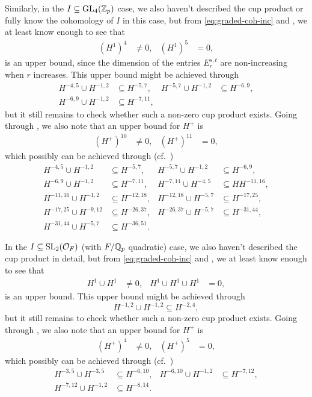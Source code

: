 Similarly, in the $I \subseteq \operatorname{GL}_{4}(\mathbb{Z}_{p})$ case, we also haven't described the cup product or fully know the cohomology of $I$ in this case, but from \eqref{eq:graded-coh-inc} and , we at least know enough to see that
\begin{align*}
  (H^{1})^{4} &\neq 0, & (H^{1})^{5} &= 0,
\end{align*}
is an upper bound, since the dimension of the entries $E_{r}^{s,t}$ are non-increasing when $r$ increases. This upper bound might be achieved through
\begin{align*}
  H^{-4,5} \cup H^{-1,2} &\subseteq H^{-5,7}, & H^{-5,7} \cup H^{-1,2} &\subseteq H^{-6,9}, \\
  H^{-6,9} \cup H^{-1,2} &\subseteq H^{-7,11},
\end{align*}
but it still remains to check whether such a non-zero cup product exists. Going through , we also note that an upper bound for $H^{+}$ is
\begin{align*}
  (H^{+})^{10} &\neq 0, & (H^{+})^{11} &= 0,
\end{align*}
which possibly can be achieved through (cf.\ \cite{code})
\begin{align*}
  H^{-4,5} \cup H^{-1,2} &\subseteq H^{-5,7}, & H^{-5,7} \cup H^{-1,2} &\subseteq H^{-6,9}, \\
  H^{-6,9} \cup H^{-1,2} &\subseteq H^{-7,11}, & H^{-7,11} \cup H^{-4,5} &\subseteq HH^{-11,16}, \\
  H^{-11,16} \cup H^{-1,2} &\subseteq H^{-12,18}, & H^{-12,18} \cup H^{-5,7} &\subseteq H^{-17,25}, \\
  H^{-17,25} \cup H^{-9,12} &\subseteq H^{-26,37}, & H^{-26,37} \cup H^{-5,7} &\subseteq H^{-31,44}, \\
  H^{-31,44} \cup H^{-5,7} &\subseteq H^{-36,51}.
\end{align*}

In the $I \subseteq \operatorname{SL}_{2}(\mathcal{O}_{F})$ (with $F/\mathbb{Q}_{p}$ quadratic) case, we also haven't described the cup product in detail, but from \eqref{eq:graded-coh-inc} and , we at least know enough to see that
\begin{align*}
  H^{1} \cup H^{1} &\neq 0, & H^{1} \cup H^{1} \cup H^{1} &= 0,
\end{align*}
is an upper bound. This upper bound might be achieved through
\begin{equation*}
  H^{-1,2} \cup H^{-1,2} \subseteq H^{-2,4},
\end{equation*}
but it still remains to check whether such a non-zero cup product exists. Going through , we also note that an upper bound for $H^{+}$ is
\begin{align*}
  (H^{+})^{4} &\neq 0, & (H^{+})^{5} &= 0,
\end{align*}
which possibly can be achieved through (cf.\ \cite{code})
\begin{align*}
  H^{-3,5} \cup H^{-3,5} &\subseteq H^{-6,10}, & H^{-6,10} \cup H^{-1,2} &\subseteq H^{-7,12}, \\
  H^{-7,12} \cup H^{-1,2} &\subseteq H^{-8,14}.
\end{align*}


